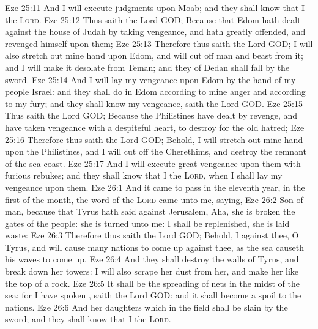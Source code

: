 \vs Eze 25:11 And I will execute judgments upon Moab; and they shall know that I  the \textsc{Lord}.
\vs Eze 25:12 Thus saith the Lord GOD; Because that Edom hath dealt against the house of Judah by taking vengeance, and hath greatly offended, and revenged himself upon them;
\vs Eze 25:13 Therefore thus saith the Lord GOD; I will also stretch out mine hand upon Edom, and will cut off man and beast from it; and I will make it desolate from Teman; and they of Dedan shall fall by the sword.
\vs Eze 25:14 And I will lay my vengeance upon Edom by the hand of my people Israel: and they shall do in Edom according to mine anger and according to my fury; and they shall know my vengeance, saith the Lord GOD.
\vs Eze 25:15 Thus saith the Lord GOD; Because the Philistines have dealt by revenge, and have taken vengeance with a despiteful heart, to destroy  for the old hatred;
\vs Eze 25:16 Therefore thus saith the Lord GOD; Behold, I will stretch out mine hand upon the Philistines, and I will cut off the Cherethims, and destroy the remnant of the sea coast.
\vs Eze 25:17 And I will execute great vengeance upon them with furious rebukes; and they shall know that I  the \textsc{Lord}, when I shall lay my vengeance upon them.
\vs Eze 26:1 And it came to pass in the eleventh year, in the first  of the month,  the word of the \textsc{Lord} came unto me, saying,
\vs Eze 26:2 Son of man, because that Tyrus hath said against Jerusalem, Aha, she is broken  the gates of the people: she is turned unto me: I shall be replenished,  she is laid waste:
\vs Eze 26:3 Therefore thus saith the Lord GOD; Behold, I  against thee, O Tyrus, and will cause many nations to come up against thee, as the sea causeth his waves to come up.
\vs Eze 26:4 And they shall destroy the walls of Tyrus, and break down her towers: I will also scrape her dust from her, and make her like the top of a rock.
\vs Eze 26:5 It shall be  the spreading of nets in the midst of the sea: for I have spoken , saith the Lord GOD: and it shall become a spoil to the nations.
\vs Eze 26:6 And her daughters which  in the field shall be slain by the sword; and they shall know that I  the \textsc{Lord}.
